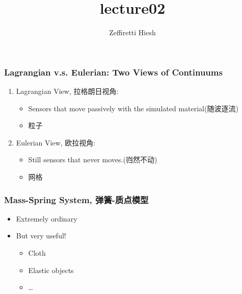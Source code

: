 \documentclass[11pt]{article}
\title{lecture02}
\author{Zeffiretti Hiesh}
\providecommand{\tightlist}{%
      \setlength{\itemsep}{0pt}\setlength{\parskip}{0pt}}
\begin{document}
    
    \maketitle
    
    

    
    \hypertarget{lagrangian-v.s.-eulerian-two-views-of-continuums}{%
\subsubsection{Lagrangian v.s. Eulerian: Two Views of
Continuums}\label{lagrangian-v.s.-eulerian-two-views-of-continuums}}

\begin{enumerate}
\def\labelenumi{\arabic{enumi}.}
\tightlist
\item
  Lagrangian View, 拉格朗日视角:

  \begin{itemize}
  \tightlist
  \item
    Sensors that move passively with the simulated material(随波逐流)
  \item
    粒子
  \end{itemize}
\item
  Eulerian View, 欧拉视角:

  \begin{itemize}
  \tightlist
  \item
    Still sensors that never moves.(岿然不动)
  \item
    网格
  \end{itemize}
\end{enumerate}

    \hypertarget{mass-spring-system-ux5f39ux7c27-ux8d28ux70b9ux6a21ux578b}{%
\subsubsection{Mass-Spring System,
弹簧-质点模型}\label{mass-spring-system-ux5f39ux7c27-ux8d28ux70b9ux6a21ux578b}}

\begin{itemize}
\tightlist
\item
  Extremely ordinary
\item
  But very useful!

  \begin{itemize}
  \tightlist
  \item
    Cloth
  \item
    Elastic objects
  \item
    \ldots{}
  \end{itemize}
\end{itemize}
\end{document}
